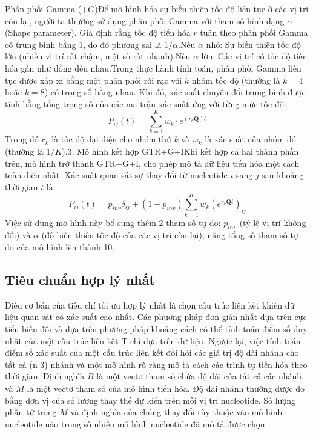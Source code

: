 \documentclass[12pt,a4paper]{report}
\begin{document}
Phân phối Gamma ($+G$)Để mô hình hóa sự biến thiên tốc độ liên tục ở các vị trí còn lại, người ta thường sử dụng phân phối Gamma với tham số hình dạng $\alpha$ (Shape parameter). Giả định rằng tốc độ tiến hóa $r$ tuân theo phân phối Gamma có trung bình bằng 1, do đó phương sai là $1/\alpha$.Nếu $\alpha$ nhỏ: Sự biến thiên tốc độ lớn (nhiều vị trí rất chậm, một số rất nhanh).Nếu $\alpha$ lớn: Các vị trí có tốc độ tiến hóa gần như đồng đều nhau.Trong thực hành tính toán, phân phối Gamma liên tục được xấp xỉ bằng một phân phối rời rạc với $k$ nhóm tốc độ (thường là $k=4$ hoặc $k=8$) có trọng số bằng nhau. Khi đó, xác suất chuyển đổi trung bình được tính bằng tổng trọng số của các ma trận xác suất ứng với từng mức tốc độ:
\begin{equation}
P_{ij}(t) = \sum_{k=1}^K w_k \cdot e^{(r_k \mathbf{Q})t}
\end{equation}
Trong đó $r_k$ là tốc độ đại diện cho nhóm thứ $k$ và $w_k$ là xác suất của nhóm đó (thường là $1/K$).3. Mô hình kết hợp GTR+G+IKhi kết hợp cả hai thành phần trên, mô hình trở thành GTR+G+I, cho phép mô tả dữ liệu tiến hóa một cách toàn diện nhất. Xác suất quan sát sự thay đổi từ nucleotide $i$ sang $j$ sau khoảng thời gian $t$ là:
\begin{equation}
P_{ij}(t) = p_{inv} \delta_{ij} + (1 - p_{inv}) \sum_{k=1}^K w_k (e^{r_k \mathbf{Q} t})_{ij}
\end{equation}
Việc sử dụng mô hình này bổ sung thêm 2 tham số tự do: $p_{inv}$ (tỷ lệ vị trí không đổi) và $\alpha$ (độ biến thiên tốc độ của các vị trí còn lại), nâng tổng số tham số tự do của mô hình lên thành 10.


\subsection{Tiêu chuẩn hợp lý nhất}

Điều cơ bản của tiêu chí tối ưu hợp lý nhất là chọn cấu trúc liên kết khiến dữ liệu quan sát có xác suất cao nhất. Các phương pháp đơn giản nhất dựa trên cực tiểu biến đổi và dựa trên phương pháp khoảng cách có thể tính toán điểm số duy nhất của một cấu trúc liên kết T chỉ dựa trên dữ liệu. Ngược lại, việc tính toán điểm số xác suất của một cấu trúc liên kết đòi hỏi các giá trị độ dài nhánh cho tất cả (n-3) nhánh và một mô hình rõ ràng mô tả cách các trình tự tiến hóa theo thời gian. Định nghĩa \(B\) là một vectơ tham số chứa độ dài của tất cả các nhánh, và \(M\) là một vectơ tham số của mô hình tiến hóa. Độ dài nhánh thường được đo bằng đơn vị của số lượng thay thế dự kiến trên mỗi vị trí nucleotide. Số lượng phần tử trong \(M\) và định nghĩa của chúng thay đổi tùy thuộc vào mô hình nucleotide nào trong số nhiều mô hình nucleotide đã mô tả được chọn.
\end{document}
